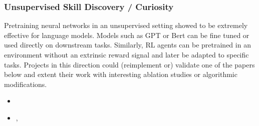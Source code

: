 \documentclass[a4paper]{article}
\begin{document}
%


\subsubsection{Unsupervised Skill Discovery / Curiosity}
Pretraining neural networks in an unsupervised setting showed to be extremely effective for language models. Models such as GPT or Bert can be fine tuned or used directly on downstream tasks.
Similarly, RL agents can be pretrained in an environment without an extrinsic reward signal and later be adapted to specific tasks.
Projects in this direction could (reimplement or) validate one of the papers below and extent their work with interesting ablation studies or algorithmic modifications.
\begin{itemize}
  \item \citet{Laskin2021}
  \item \citet{Hafner2021}, \cite{Hafner2023}
\end{itemize}
\end{document}

